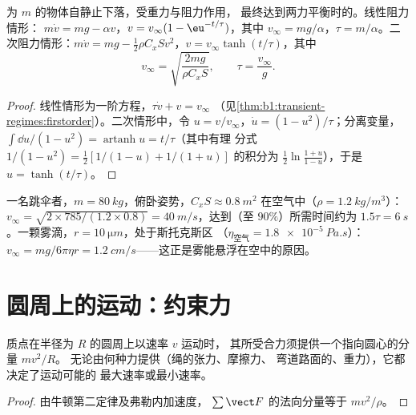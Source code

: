 \begin{proposition}\label{prop:b1:newton-dynamics:terminal}
为 $m$ 的物体自静止下落，受重力与阻力作用，
最终达到两力平衡时的\emph{}。线性阻力情形：
$m\dot v = mg - \alpha v$，$v = v_\infty(1 - \eu^{-t/\tau})$，其中
$v_\infty = mg/\alpha$，$\tau = m/\alpha$。二次阻力情形：$m\dot v = mg -
\tfrac12\rho C_xSv^2$，$v = v_\infty\tanh(t/\tau)$，其中
\[
v_\infty = \sqrt{\frac{2mg}{\rho C_xS}}, \qquad \tau = \frac{v_\infty}{g} .
\]
\end{proposition}

\begin{proof}
线性情形为一阶方程，$\tau\dot v + v = v_\infty$
（见\cref{thm:b1:transient-regimes:firstorder}）。二次情形中，令
$u = v/v_\infty$，$\dot u = (1 - u^2)/\tau$；分离变量，
$\int\dd u/(1 - u^2) = \operatorname{artanh}u = t/\tau$（其中有理
分式 $1/(1 - u^2) = \tfrac12[1/(1 - u) + 1/(1 + u)]$ 的积分为
$\tfrac12\ln\frac{1 + u}{1 - u}$），于是 $u = \tanh(t/\tau)$。
\end{proof}

\begin{example}[两种终端速度]\label{ex:b1:newton-dynamics:terminal}
一名跳伞者，$m = \qty{80}{kg}$，俯卧姿势，$C_xS \approx \qty{0.8}{m^2}$
在空气中（$\rho = \qty{1.2}{kg/m^3}$）：$v_\infty = \sqrt{2 \times 785/(1.2
\times 0.8)} = \qty{40}{m/s}$，达到（至 $90\%$）所需时间约为 $1.5\tau =
\qty{6}{s}$。一颗雾滴，$r = \qty{10}{\micro m}$，处于斯托克斯区
（$\eta_{\text{空气}} = \qty{1.8e-5}{Pa.s}$）：$v_\infty = mg/6\pi\eta r =
\qty{1.2}{cm/s}$——这正是雾能悬浮在空中的原因。
\end{example}

\section{圆周上的运动：约束力}

\begin{proposition}[向心条件]\label{prop:b1:newton-dynamics:centripetal}
质点在半径为 $R$ 的圆周上以速率 $v$ 运动时，
其所受合力须提供一个指向圆心的分量 $mv^2/R$。
无论由何种力提供（绳的张力、摩擦力、
弯道路面的、重力），它都决定了运动可能的
最大速率或最小速率。
\end{proposition}

\begin{proof}
由牛顿第二定律及弗勒内加速度，
$\sum\vect F$ 的法向分量等于 $mv^2/\rho$。
\end{proof}

